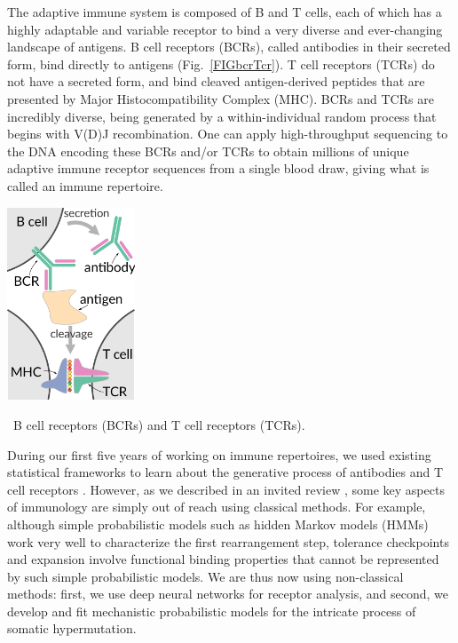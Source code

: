 \documentclass[nobib]{tufte-handout}
\begin{document}
The adaptive immune system is composed of B and T cells, each of which has a highly adaptable and variable receptor to bind a very diverse and ever-changing landscape of antigens.
B cell receptors (BCRs), called antibodies in their secreted form, bind directly to antigens (Fig.~\ref{FIGbcrTcr}).
T cell receptors (TCRs) do not have a secreted form, and bind cleaved antigen-derived peptides that are presented by Major Histocompatibility Complex (MHC).
BCRs and TCRs are incredibly diverse, being generated by a within-individual random process that begins with V(D)J recombination.
One can apply high-throughput sequencing to the DNA encoding these BCRs and/or TCRs to obtain millions of unique adaptive immune receptor sequences from a single blood draw, giving what is called an immune repertoire.

\begin{marginfigure}[-0.4in]%
\begin{centering}
  \includegraphics[width=1.5in]{bcr-tcr}
\end{centering}
  \caption{\
    B cell receptors (BCRs) and T cell receptors (TCRs).
    }
  \label{FIGbcrTcr}
\end{marginfigure}%

During our first five years of working on immune repertoires, we used existing statistical frameworks to learn about the generative process of antibodies and T cell receptors \cite{McCoy2015-qi, Ralph2016-kr, Ralph2016-yl, Ralph2017-ih, DeWitt2018-el, Dhar2018-ne, Zhang2018-gn, Davidsen2018-gn, DeWitt2018-ar, Simonich2019-nn, Feng2019-sj, Dhar2019-qg}.
However, as we described in an invited review \cite{Olson2018-lw}, some key aspects of immunology are simply out of reach using classical methods.
For example, although simple probabilistic models such as hidden Markov models (HMMs) work very well to characterize the first rearrangement step, tolerance checkpoints and expansion involve functional binding properties that cannot be represented by such simple probabilistic models.
We are thus now using non-classical methods:
first, we use deep neural networks for receptor analysis, and second, we develop and fit mechanistic probabilistic models for the intricate process of somatic hypermutation.
\end{document}
